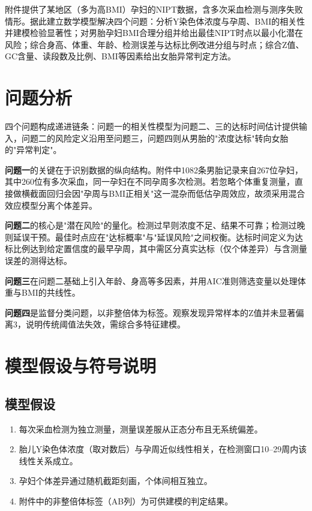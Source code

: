 \documentclass[12pt]{ctexart}
\begin{document}
附件提供了某地区（多为高BMI）孕妇的NIPT数据，含多次采血检测与测序失败情形。据此建立数学模型解决四个问题：分析Y染色体浓度与孕周、BMI的相关性并建模检验显著性；对男胎孕妇BMI合理分组并给出最佳NIPT时点以最小化潜在风险；综合身高、体重、年龄、检测误差与达标比例改进分组与时点；综合Z值、GC含量、读段数及比例、BMI等因素给出女胎异常判定方法。

\section{问题分析}

四个问题构成递进链条：问题一的相关性模型为问题二、三的达标时间估计提供输入，问题二的风险定义沿用至问题三，问题四则从男胎的"浓度达标"转向女胎的"异常判定"。

\textbf{问题一}的关键在于识别数据的纵向结构。附件中1082条男胎记录来自267位孕妇，其中260位有多次采血，同一孕妇在不同孕周多次检测。若忽略个体重复测量，直接做横截面回归会因"孕周与BMI正相关"这一混杂而低估孕周效应，故须采用混合效应模型分离个体差异。

\textbf{问题二}的核心是"潜在风险"的量化。检测过早则浓度不足、结果不可靠；检测过晚则延误干预。最佳时点应在"达标概率"与"延误风险"之间权衡。达标时间定义为达标比例达到给定置信度的最早孕周，其中需区分真实达标（仅个体差异）与含测量误差的测得达标。

\textbf{问题三}在问题二基础上引入年龄、身高等多因素，并用AIC准则筛选变量以处理体重与BMI的共线性。

\textbf{问题四}是监督分类问题，以非整倍体为标签。观察发现异常样本的Z值并未显著偏离3，说明传统阈值法失效，需综合多特征建模。

\section{模型假设与符号说明}

\subsection{模型假设}
\begin{enumerate}[label=(\arabic*)]
    \item 每次采血检测为独立测量，测量误差服从正态分布且无系统偏差。
    \item 胎儿Y染色体浓度（取对数后）与孕周近似线性相关，在检测窗口10--29周内该线性关系成立。
    \item 孕妇个体差异通过随机截距刻画，个体间相互独立。
    \item 附件中的非整倍体标签（AB列）为可供建模的判定结果。
\end{enumerate}
\end{document}
